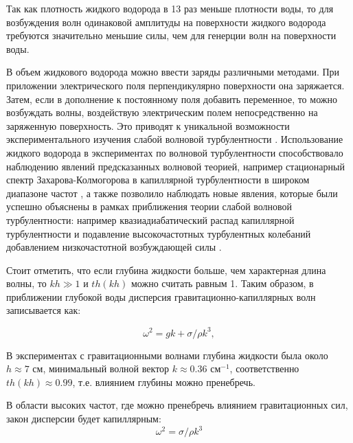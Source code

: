 Так как плотность жидкого водорода в 13 раз меньше плотности воды, то для возбуждения волн одинаковой амплитуды на поверхности жидкого водорода требуются значительно меньшие силы, чем для генерции волн на поверхности воды. 

В объем жидкового водорода можно ввести заряды различными методами. При приложении электрического поля перпендикулярно поверхности она заряжается. Затем, если в дополнение к постоянному поля добавить переменное, то можно возбуждать волны, воздействую электрическим полем непосредственно на заряженную поверхность. Это  приводят к уникальной возможности экспериментального изучения слабой волновой турбулентности . Использование жидкого водорода в экспериментах по волновой турбулентности способствовало наблюдению явлений предсказанных волновой теорией, например стационарный спектр Захарова-Колмогорова в капиллярной турбулентности в широком диапазоне частот \cite{Brazhnikov2001}, а также позволило наблюдать новые явления, которые были успешно объяснены в рамках приближения теории слабой волновой турбулентности: например квазиадиабатический распад капиллярной турбулентности \cite{quasiadiabatic} и подавление высокочастотных турбулентных колебаний добавлением низкочастотной возбуждающей силы \cite{addLowFreq}.

Стоит отметить, что если глубина жидкости больше, чем характерная длина волны, то $kh\gg 1$ и $th(kh)$ можно считать равным 1. Таким образом, в приближении глубокой воды дисперсия гравитационно-капиллярных волн записывается как:


\begin{equation}
 \label{eq:disper}
\omega^2 = gk + \sigma/\rho k^3,
\end{equation}


В экспериментах с гравитационными волнами глубина жидкости была около $ h \approx 7$ см, минимальный волной вектор $k \approx 0.36$ см$^{-1}$, соответственно $th(kh) \approx 0.99$, т.е. влиянием глубины можно пренебречь.


В области высоких частот, где можно пренебречь влиянием гравитационных сил, закон дисперсии будет капиллярным:
\begin{equation}
 \label{eq:disperCap}
\omega^2 = \sigma/\rho k^3
\end{equation}


